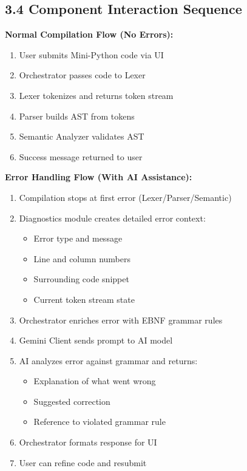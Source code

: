 \documentclass[a4paper,11pt]{article}
\begin{document}
\subsection{3.4 Component Interaction Sequence}

\textbf{Normal Compilation Flow (No Errors):}
\begin{enumerate}
    \item User submits Mini-Python code via UI
    \item Orchestrator passes code to Lexer
    \item Lexer tokenizes and returns token stream
    \item Parser builds AST from tokens
    \item Semantic Analyzer validates AST
    \item Success message returned to user
\end{enumerate}

\textbf{Error Handling Flow (With AI Assistance):}
\begin{enumerate}
    \item Compilation stops at first error (Lexer/Parser/Semantic)
    \item Diagnostics module creates detailed error context:
    \begin{itemize}
        \item Error type and message
        \item Line and column numbers
        \item Surrounding code snippet
        \item Current token stream state
    \end{itemize}
    \item Orchestrator enriches error with EBNF grammar rules
    \item Gemini Client sends prompt to AI model
    \item AI analyzes error against grammar and returns:
    \begin{itemize}
        \item Explanation of what went wrong
        \item Suggested correction
        \item Reference to violated grammar rule
    \end{itemize}
    \item Orchestrator formats response for UI
    \item User can refine code and resubmit
\end{enumerate}
\end{document}
